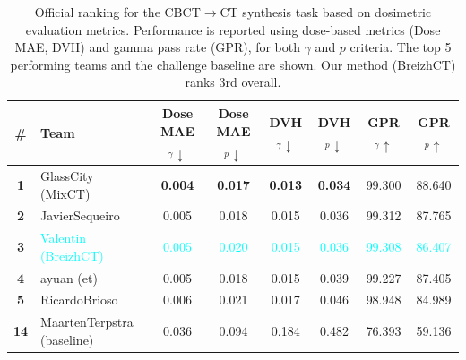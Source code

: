 \begin{table}[h!]
\centering
\scriptsize
\renewcommand{\arraystretch}{1}
\setlength{\tabcolsep}{4pt}
\caption{Official ranking for the CBCT$\rightarrow$CT synthesis task based on dosimetric evaluation metrics. Performance is reported using dose-based metrics (Dose MAE, DVH) and gamma pass rate (GPR), for both $\gamma$ and $p$ criteria. The top 5 performing teams and the challenge baseline are shown. Our method (BreizhCT) ranks 3rd overall.}
\label{tab:cbctct_dose}
\begin{tabular}{clcccccc}
\toprule
\textbf{\#} & \textbf{Team} 
& \textbf{Dose MAE$_\gamma\downarrow$} 
& \textbf{Dose MAE$_p\downarrow$} 
& \textbf{DVH$_\gamma\downarrow$} 
& \textbf{DVH$_p\downarrow$} 
& \textbf{GPR$_\gamma\uparrow$} 
& \textbf{GPR$_p\uparrow$} \\
\midrule
\textbf{1} & GlassCity (MixCT) 
& \textbf{0.004} & \textbf{0.017} & \textbf{0.013} & \textbf{0.034} & 99.300 & 88.640 \\
\textbf{2} & JavierSequeiro 
& 0.005 & 0.018 & 0.015 & 0.036 & 99.312 & 87.765 \\
\textbf{3} & \textcolor{cyan}{Valentin (BreizhCT)} 
& \textcolor{cyan}{0.005} & \textcolor{cyan}{0.020} & \textcolor{cyan}{0.015} & \textcolor{cyan}{0.036} & \textcolor{cyan}{99.308} & \textcolor{cyan}{86.407} \\
\textbf{4} & ayuan (et) 
& 0.005 & 0.018 & 0.015 & 0.039 & 99.227 & 87.405 \\
\textbf{5} & RicardoBrioso 
& 0.006 & 0.021 & 0.017 & 0.046 & 98.948 & 84.989 \\
\midrule
\textbf{14} & MaartenTerpstra (baseline) 
& 0.036 & 0.094 & 0.184 & 0.482 & 76.393 & 59.136 \\
\bottomrule
\end{tabular}

\end{table}
